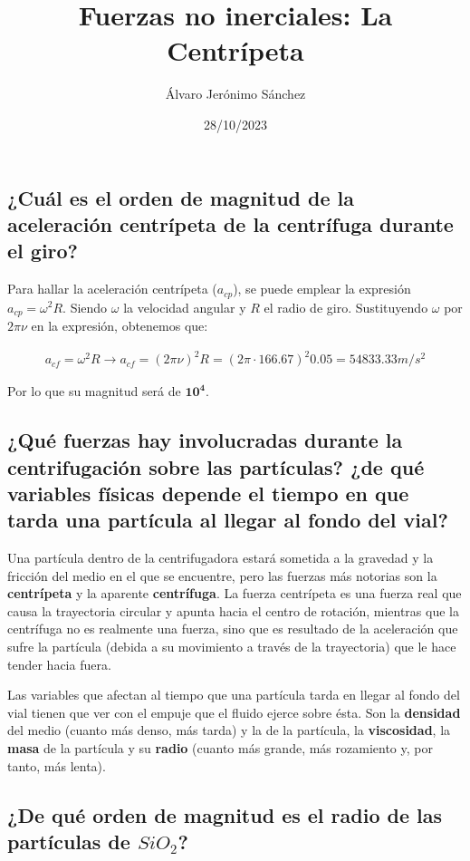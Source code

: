 \documentclass[]{scrartcl}
\title{\vspace{-1.8cm}Fuerzas no inerciales: La Centrípeta}
\author{Álvaro Jerónimo Sánchez}
\date{28/10/2023}
\begin{document}
\maketitle
\setcounter{section}{4}

\subsection{¿Cuál es el orden de magnitud de la aceleración centrípeta de la centrífuga durante el giro?}

Para hallar la aceleración centrípeta ($a_{cp}$), se puede emplear la expresión $a_{cp}=\omega ^{2}R$. Siendo $\omega$ la velocidad angular y $R$ el radio de giro. Sustituyendo $\omega$ por $2\pi \nu$ en la expresión, obtenemos que:

\begin{gather*}
    a_{cf}=\omega ^{2}R \rightarrow a_{cf}=(2\pi \nu)^{2}R = (2\pi \cdot 166.67)^{2}0.05 = \boxed{54833.33 m/s^{2}}
\end{gather*}

Por lo que su magnitud será de $\boxed{\mathbf{10^{4}}}$.

\subsection{¿Qué fuerzas hay involucradas durante la centrifugación sobre las partículas? ¿de qué variables físicas depende el tiempo en que tarda una partícula al llegar al fondo del vial?}

Una partícula dentro de la centrifugadora estará sometida a la gravedad y la fricción del medio en el que se encuentre, pero las fuerzas más notorias son la \textbf{centrípeta} y la aparente \textbf{centrífuga}. La fuerza centrípeta es una fuerza real que causa la trayectoria circular y apunta hacia el centro de rotación, mientras que la centrífuga no es realmente una fuerza, sino que es resultado de la aceleración que sufre la partícula (debida a su movimiento a través de la trayectoria) que le hace tender hacia fuera.

Las variables que afectan al tiempo que una partícula tarda en llegar al fondo del vial tienen que ver con el empuje que el fluido ejerce sobre ésta. Son la \textbf{densidad} del medio (cuanto más denso, más tarda) y la de la partícula, la \textbf{viscosidad}, la \textbf{masa} de la partícula y su \textbf{radio} (cuanto más grande, más rozamiento y, por tanto, más lenta).

\pagebreak
\subsection{¿De qué orden de magnitud es el radio de las partículas de $SiO_{2}$?}
\end{document}
